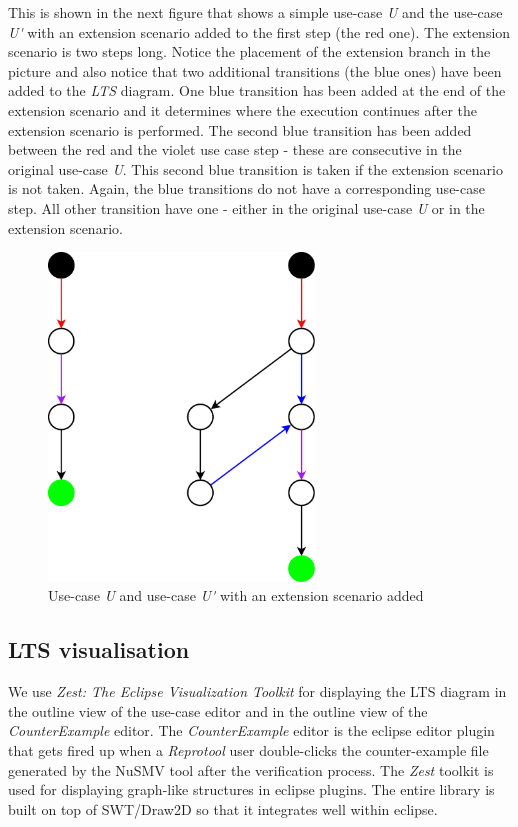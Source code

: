 This is shown in the next figure that shows a simple use-case \emph{U} and the use-case \emph{U\'} with an extension scenario added
to the first step (the red one). The extension scenario is two steps long.
Notice the placement of the extension branch in the picture and also notice that two additional transitions (the blue ones) have been
added to the \emph{LTS} diagram. One blue transition has been added at the end of the extension scenario and it determines where
the execution continues after the extension scenario is performed. The second blue transition has been added between the red and the
violet use case step - these are consecutive in the original use-case \emph{U}. This second blue transition is taken if the extension
scenario is not taken. Again, the blue transitions do not have a corresponding use-case step. All other transition have one - either
in the original use-case \emph{U} or in the extension scenario.

\begin{figure}[ht]
  \centering
  \includegraphics[width=200pt]{images/extension}
  \caption{Use-case \emph{U} and use-case \emph{U\'} with an extension scenario added}
  \label{fig:ExtensionScenario}
\end{figure}

\subsection{LTS visualisation}

We use \emph{Zest: The Eclipse Visualization Toolkit} for displaying the LTS diagram in the outline view of the use-case editor and
in the outline view of the \emph{CounterExample} editor. The \emph{CounterExample} editor is the eclipse editor plugin that
gets fired up when a \emph{Reprotool} user double-clicks the counter-example file generated by the NuSMV tool after the verification
process. The \emph{Zest} toolkit is used for displaying graph-like structures in eclipse plugins. The entire library is built on top of SWT/Draw2D so that
it integrates well within eclipse.